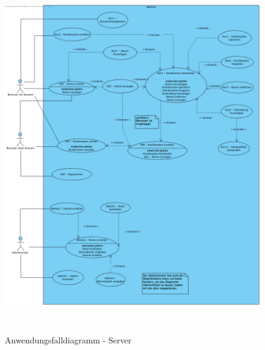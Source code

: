 \begin{figure}[h]
	\centering
	\includegraphics[width=\textwidth,height=15.5cm,keepaspectratio]{img/website}
	\caption{Anwendungsfalldiagramm - Server}
	\label{fig:anwendungsfalldiagramm-server}
\end{figure}

\newpage

